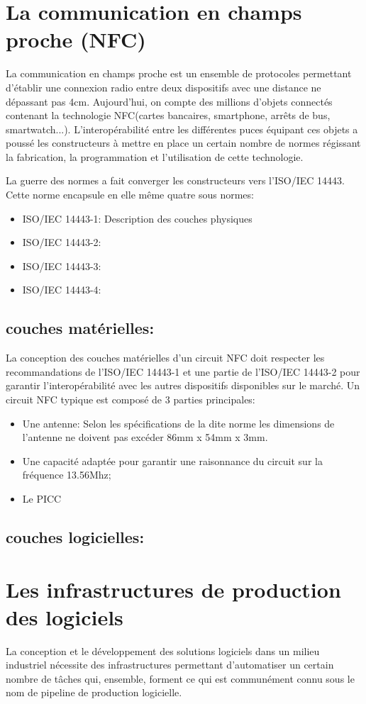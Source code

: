 \documentclass{themeensg}
\begin{document}
\section{La communication en champs proche (NFC)}
La communication en champs proche est un ensemble de protocoles permettant d'établir une connexion radio entre deux dispositifs avec une distance ne dépassant pas 4cm. Aujourd'hui, on compte des millions d'objets connectés contenant la technologie NFC(cartes bancaires, smartphone, arrêts de bus, smartwatch...). L'interopérabilité entre les différentes puces équipant ces objets a poussé les constructeurs à mettre en place un certain nombre de normes régissant la fabrication, la programmation et l'utilisation de cette technologie.

La guerre des normes a fait converger les constructeurs vers l'ISO/IEC 14443. Cette norme encapsule en elle même quatre sous normes:

\begin{itemize}
\item ISO/IEC 14443-1: Description des couches physiques
\item ISO/IEC 14443-2: 
\item ISO/IEC 14443-3:
\item ISO/IEC 14443-4: 
\end{itemize}

\subsection{couches matérielles:}
La conception des couches matérielles d'un circuit NFC doit respecter les recommandations de l'ISO/IEC 14443-1 et une partie de l'ISO/IEC 14443-2 pour garantir l'interopérabilité avec les autres dispositifs disponibles sur le marché. Un circuit NFC typique est composé de 3 parties principales:
\begin{itemize}
\item Une antenne: Selon les spécifications de la dite norme les dimensions de l'antenne ne doivent pas excéder 86mm x 54mm x 3mm.
\item Une capacité adaptée pour garantir une raisonnance du circuit sur la fréquence 13.56Mhz;
\item Le PICC
\end{itemize}
\subsection{couches logicielles:}


\section{Les infrastructures de production des logiciels}
La conception et le développement des solutions logiciels dans un milieu industriel nécessite des infrastructures permettant d'automatiser un certain nombre de tâches qui, ensemble, forment ce qui est communément connu sous le nom de pipeline de production logicielle.
\end{document}
